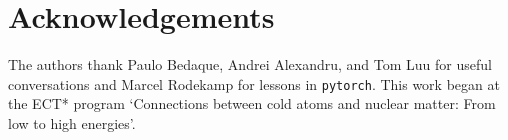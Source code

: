 \section*{Acknowledgements}

The authors thank Paulo Bedaque, Andrei Alexandru, and Tom Luu for useful conversations and Marcel Rodekamp for lessons in \texttt{pytorch}.
This work began at the ECT* program `Connections between cold atoms and nuclear matter: From low to high energies'.
